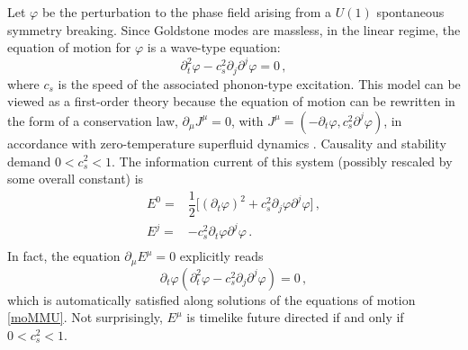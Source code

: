\documentclass[a4paper, amsfonts, amssymb, amsmath, reprint, showkeys, nofootinbib, twoside,notitlepage,onecolumn,preprintnumbers]{revtex4-2}
\theoremstyle{definition}
\theoremstyle{theorem}
\theoremstyle{corollary}
\begin{document}
Let $\varphi$ be the perturbation to the phase field arising from a $U(1)$ spontaneous symmetry breaking. Since Goldstone modes are massless, in the linear regime, the equation of motion for $\varphi$ is a wave-type equation:
\begin{equation}\label{moMMU}
\partial^2_t \varphi -c_s^2 \partial_j \partial^j \varphi=0 \, ,
\end{equation}
where $c_s$ is the speed of the associated phonon-type excitation. This model can be viewed as a first-order theory because the equation of motion can be rewritten in the form of a conservation law, $\partial_\mu J^\mu=0$, with $J^\mu =(-\partial_t \varphi,c_s^2 \partial^j \varphi)$, in accordance with zero-temperature superfluid dynamics \cite{cool1995,Termo,GavassinoStabilityCarter2022}. Causality and stability demand $0<c_s^2<1$. The information current of this system (possibly rescaled by some overall constant) is
\begin{equation}\label{uuuno}
\begin{split}
E^0 ={}& \dfrac{1}{2}\big[(\partial_t \varphi)^2+c_s^2 \partial_j \varphi \partial^j \varphi \big] \, , \\
E^j ={}& -c_s^2 \partial_t \varphi \partial^j \varphi \, . \\
\end{split}
\end{equation}
In fact, the equation $\partial_\mu E^\mu =0$ explicitly reads
\begin{equation}
\partial_t \varphi (\partial^2_t \varphi -c_s^2 \partial_j \partial^j \varphi)=0 \, ,
\end{equation}
which is automatically satisfied along solutions of the equations of motion \eqref{moMMU}. Not surprisingly, $E^\mu$ is timelike future directed if and only if $0<c_s^2<1$.
\end{document}
